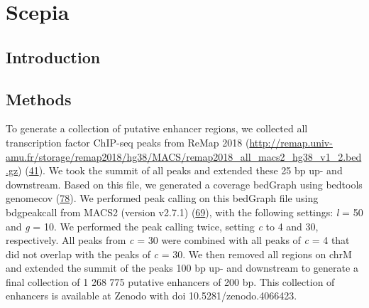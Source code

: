 \chapter{Scepia}\thumbforchapter
{}
\newpage

\section{Introduction}

\section{Methods}

To generate a collection of putative enhancer regions, we collected all transcription factor ChIP-seq peaks from ReMap 2018 (\href{http://remap.univ-amu.fr/storage/remap2018/hg38/MACS/remap2018_all_macs2_hg38_v1_2.bed.gz}{http://remap.univ-amu.fr/storage/remap2018/hg38/MACS/remap2018\_all\_macs2\_hg38\_v1\_2.bed.gz}) (\href{javascript:;}{41}). We took the summit of all peaks and extended these 25 bp up- and downstream. Based on this file, we generated a coverage bedGraph using bedtools genomecov (\href{javascript:;}{78}). We performed peak calling on this bedGraph file using bdgpeakcall from MACS2 (version v2.7.1) (\href{javascript:;}{69}), with the following settings: \textit{l} = 50 and \textit{g} = 10. We performed the peak calling twice, setting \textit{c} to 4 and 30, respectively. All peaks from \textit{c} = 30 were combined with all peaks of \textit{c} = 4 that did not overlap with the peaks of \textit{c} = 30. We then removed all regions on chrM and extended the summit of the peaks 100 bp up- and downstream to generate a final collection of 1 268 775 putative enhancers of 200 bp. This collection of enhancers is available at Zenodo with doi 10.5281/zenodo.4066423.
